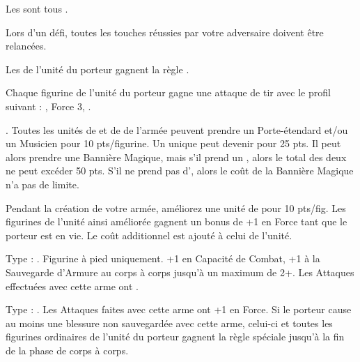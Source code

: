 \begin{multicols}{2}
\endpricelistNSP

\startarmynewsection{\kindreds}

\spaceaftersection{}

Les \aspectsofnature{} sont tous \oneperarmy{}.

\startpricelistNSP

 Lors d'un défi, toutes les touches réussies par votre adversaire doivent être relancées.

 Les \dryads{} de l'unité du porteur gagnent la règle \hatred{}.

Chaque figurine de l'unité du porteur gagne une attaque de tir avec le profil suivant : , Force 3, .

. Toutes les unités de \dryads et de \thicketbeasts{} de l'armée peuvent prendre un Porte-étendard et/ou un Musicien pour 10 pts/figurine. Un unique \thicketshepherd{} peut devenir \bsb{} pour 25 pts. Il peut alors prendre une Bannière Magique, mais s'il prend un \aspectofnature{}, alors le total des deux ne peut excéder 50 pts. S'il ne prend pas d'\aspectofnature{}, alors le coût de la Bannière Magique n'a pas de limite.

Pendant la création de votre armée, améliorez une unité de \thicketbeasts{} pour 10 pts/fig. Les figurines de l'unité ainsi améliorée gagnent un bonus de +1 en Force  tant que le porteur est en vie. Le coût additionnel est ajouté à celui de l'unité.

\endpricelistNSP
\end{multicols}

\closearmynewsection

\startarmymagicalitems

\armymagicalweapons

\startpricelist

Type : \gw{}. Figurine à pied uniquement. +1 en Capacité de Combat, +1 à la Sauvegarde d'Armure au corps à corps jusqu'à un maximum de 2+. Les Attaques effectuées avec cette arme ont .

Type : \spear{}. Les Attaques faites avec cette arme ont +1 en Force. Si le porteur cause au moins une blessure non sauvegardée avec cette arme, celui-ci et toutes les figurines ordinaires de l'unité du porteur gagnent la règle spéciale \distracting{} jusqu'à la fin de la phase de corps à corps.

